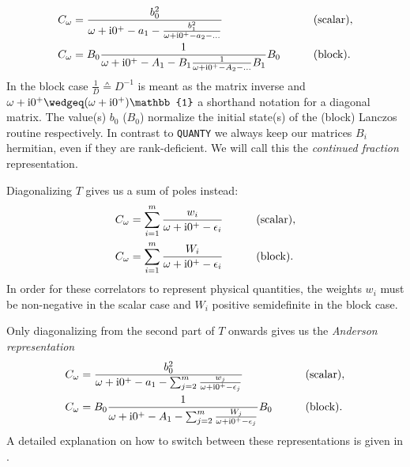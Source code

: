 \begin{subequations}
    \begin{align}
        C_\omega
         & =
        \frac{b_0^2}{\omega + \mathrm{i}0^+ - a_1 - \frac{b_1^2}{\omega + \mathrm{i}0^+ - a_2 - \ldots}}
        \qquad
         &
         & \text{(scalar)},                                                                         \\
        C_\omega
         & = B_0\frac{1}{\omega + \mathrm{i}0^+ - A_1 - B_1\frac{1}{\omega + \mathrm{i}0^+ - A_2 - \ldots}B_1}B_0
        \qquad
         &
         & \text{(block)}.
    \end{align}
\end{subequations}
In the block case $\frac{1}{D} \wedgeq D^{-1}$ is meant as the matrix inverse
and $\omega + \mi0^+ \wedgeq (\omega + \mi0^+)\mathbb{1}$ a shorthand notation
for a diagonal matrix.
The value(s) $b_0$ ($B_0$) normalize the initial state(s) of
the (block) Lanczos routine respectively.
In contrast to \texttt{QUANTY} \cite{Ackermann2024} we always keep our matrices $B_i$ hermitian,
even if they are rank-deficient.
We will call this the \emph{continued fraction} representation.

Diagonalizing $T$ gives us a sum of poles instead:
\begin{subequations}
    \begin{align}
        C_\omega
         & =
        \sum_{i=1}^m \frac{w_i}{\omega + \mathrm{i}0^+ - \epsilon_i}
        \qquad
         &   & \text{(scalar)}, \\
        C_\omega
         & =
        \sum_{i=1}^m \frac{W_i}{\omega + \mathrm{i}0^+ - \epsilon_i}
        \qquad
         &   & \text{(block)}.
    \end{align}
\end{subequations}
In order for these correlators to represent physical quantities,
the weights $w_i$ must be non-negative in the scalar case
and $W_i$ positive semidefinite in the block case.

Only diagonalizing from the second part of $T$ onwards gives us the \emph{Anderson representation}
\begin{subequations}
    \begin{align}
        C_\omega
         & =
        \frac{b_0^2}{\omega + \mathrm{i}0^+ - a_1 - \sum_{j=2}^m \frac{w_j}{\omega + \mathrm{i}0^+ - \epsilon_j}}
        \qquad
         &
         &
        \text{(scalar)},                                                                                   \\
        C_\omega
         & = B_0\frac{1}{\omega + \mathrm{i}0^+ - A_1 - \sum_{j=2}^m \frac{W_j}{\omega + \mathrm{i}0^+ - \epsilon_j}}B_0
        \qquad
         &
         &
        \text{(block)}.
        \label{eq:correlator-anderson-block}
    \end{align}
\end{subequations}
A detailed explanation on how to switch between these representations is given in \cite{Lu2014}.

